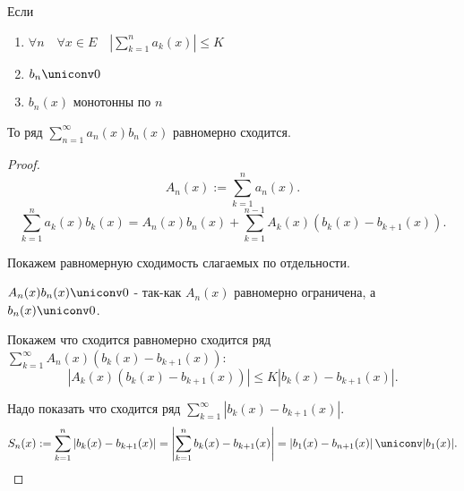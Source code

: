 \begin{theorem} \thmslashn

    Если
    \begin{enumerate}
        \item $\forall{n}\quad \forall{x\in E}\quad \left|\sum\limits_{k=1}^{n} a_{k}(x)\right| \le K$ 
        \item $b_{n} \uniconv 0$ 
        \item $b_{n}(x)$ монотонны по $n$
    \end{enumerate}
    
    То ряд $\sum\limits_{n=1}^{\infty} a_{n}(x)b_{n}(x)$ равномерно сходится.
    \begin{proof} \thmslashn
    
        \[ A_{n}(x) := \sum\limits_{k=1}^{n} a_{n}(x) .\]
        \[ \sum\limits_{k=1}^{n} a_{k}(x)b_{k}(x) = A_{n}(x)b_{n}(x) + \sum\limits_{k=1}^{n-1} A_{k}(x)(b_{k}(x)-b_{k+1}(x)) .\]

        Покажем равномерную сходимость слагаемых по отдельности.

        $A_{n}(x)b_{n}(x) \uniconv 0$ - так-как $A_{n}(x)$ равномерно ограничена, а $b_{n}(x) \uniconv 0$.

        Покажем что сходится равномерно сходится ряд $\sum\limits_{k=1}^{\infty} A_{n}(x)(b_{k}(x) - b_{k+1}(x))$:
        \[ |A_{k}(x)(b_{k}(x)-b_{k+1}(x))| \le K|b_{k}(x)-b_{k+1}(x)| .\]

        Надо показать что сходится ряд $\sum\limits_{k=1}^{\infty} |b_{k}(x) - b_{k+1}(x)|$. 
        \[ S_{n}(x) := \sum\limits_{k=1}^{n} |b_{k}(x) - b_{k+1}(x)| = \left|\sum\limits_{k=1}^{n} b_{k}(x)-b_{k+1}(x)\right| = \left| b_1(x) - b_{n+1}(x)\right| \uniconv |b_1(x)|.\qedhere\] 
    \end{proof}
\end{theorem}
